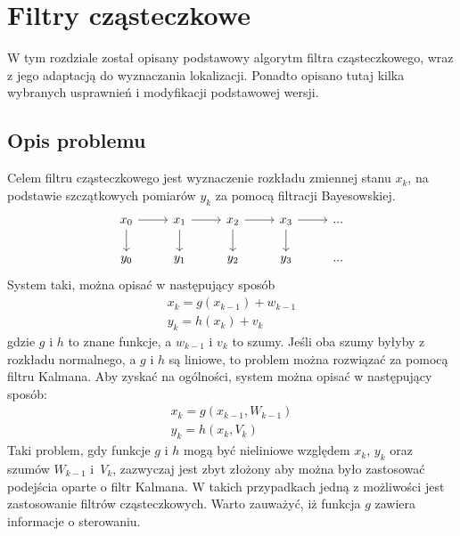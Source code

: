 \chapter{Filtry cząsteczkowe}
W tym rozdziale został opisany podstawowy algorytm filtra cząsteczkowego, wraz z jego adaptacją do wyznaczania lokalizacji. Ponadto opisano tutaj kilka wybranych usprawnień i modyfikacji podstawowej wersji.
\section{Opis problemu}
Celem filtru cząsteczkowego jest wyznaczenie rozkładu zmiennej stanu $x_k$, na podstawie szczątkowych pomiarów $y_k$ za pomocą filtracji Bayesowskiej. \\
\begin{equation*}
\begin{tikzcd}
	x_0 \arrow{r} \arrow{d} &x_1 \arrow{r} \arrow{d} &x_2 \arrow{r} \arrow{d} &x_3\arrow{r} \arrow{d} &...\\
	y_0 &y_1 &y_2 &y_3 &...
\end{tikzcd} 
\end{equation*}
System taki, można opisać w następujący sposób
\begin{equation*}
	\begin{aligned}
		x_k=g(x_{k-1})+w_{k-1} \\
		y_k=h(x_k)+v_k
	\end{aligned}
\end{equation*}
gdzie $g$ i $h$ to znane funkcje, a $w_{k-1}$ i $v_k$ to szumy. Jeśli oba szumy byłyby z rozkładu normalnego, a $g$ i $h$ są liniowe, to problem można rozwiązać za pomocą filtru Kalmana. Aby zyskać na ogólności, system można opisać w następujący sposób:
\begin{equation} \label{problem_eq}
	\begin{aligned}
		x_k=g(x_{k-1}, W_{k-1}) \\
		y_k=h(x_k, V_k)
	\end{aligned}
\end{equation}
Taki problem, gdy funkcje $g$ i $h$ mogą być nieliniowe względem $x_k$, $y_k$ oraz szumów $W_{k-1}$ i~$V_k$, zazwyczaj jest zbyt złożony aby można było zastosować podejścia oparte o filtr Kalmana. W takich przypadkach jedną z możliwości jest zastosowanie filtrów cząsteczkowych. Warto zauważyć, iż funkcja $g$ zawiera informacje o sterowaniu.

